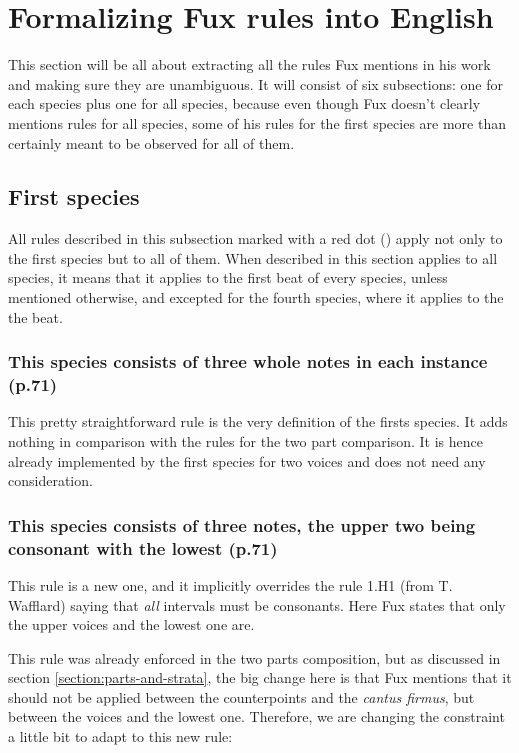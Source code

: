 \chapter{Formalizing Fux rules into English}
This section will be all about extracting all the rules Fux mentions in his work and making sure they are unambiguous.
It will consist of six subsections: one for each species plus one for all species, because even though Fux doesn't clearly mentions rules for all species, some of his rules for the first species are more than certainly meant to be observed for all of them. 

\section{First species}
All rules described in this subsection marked with a red dot (\reddot) apply not only to the first species but to all of them. When described in this section applies to all species, it means that it applies to the first beat of every species, unless mentioned otherwise, and excepted for the fourth species, where it applies to the the beat.

\subsection{This species consists of three whole notes in each instance (p.71)}
This pretty straightforward rule is the very definition of the firsts species. It adds nothing in comparison with the rules for the two part comparison. It is hence already implemented by the first species for two voices and does not need any consideration. 

\subsection{\reddot This species consists of three notes, the upper two being consonant with the lowest (p.71)} \label{rule:consonant}
This rule is a new one, and it implicitly overrides the rule 1.H1 (from T. Wafflard) saying that \textit{all} intervals must be consonants. Here Fux states that only the upper voices and the lowest one are.

This rule was already enforced in the two parts composition, but as discussed in section \ref{section:parts-and-strata}, the big change here is that Fux mentions that it should not be applied between the counterpoints and the \textit{cantus firmus}, but between the voices and the lowest one. Therefore, we are changing the constraint %
a little bit to adapt to this new rule:

